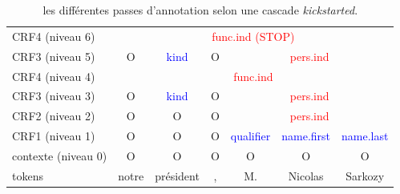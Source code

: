 \documentclass[12pt,a4paper,times,twoside,openright]{report}
\begin{document}
\begin{table}[ht!]
    \centering
    \begin{tabular}{|l|cccccc|}
    \hline
    \cline{2-7}
    CRF4 (niveau 6)     & \multicolumn{6}{c|}{\textcolor{red}{func.ind (STOP)}} \\
    \cline{2-7}
    CRF3 (niveau 5)     & O & \multicolumn{1}{|c|}{\textcolor{blue}{kind}} & O & \multicolumn{3}{|c|}{\textcolor{red}{pers.ind}} \\
    \cline{2-7}
    CRF4 (niveau 4)     & \multicolumn{6}{c|}{\textcolor{red}{func.ind}} \\
    \cline{2-7}
    CRF3 (niveau 3)     & O & \multicolumn{1}{|c|}{\textcolor{blue}{kind}} & O & \multicolumn{3}{|c|}{\textcolor{red}{pers.ind}} \\
    \cline{3-3}\cline{5-7}
    CRF2 (niveau 2)     & O & O & O & \multicolumn{3}{|c|}{\textcolor{red}{pers.ind}} \\
    \cline{5-7}
    CRF1 (niveau 1)     & O & O & O & \multicolumn{1}{|c|}{\textcolor{blue}{qualifier}} & \multicolumn{1}{c|}{\textcolor{blue}{name.first}} & \multicolumn{1}{c|}{\textcolor{blue}{name.last}} \\
    \cline{5-7}
    contexte (niveau 0) & O & O & O & O & O & O \\
    \hline
    tokens                & notre & président & , & M. & Nicolas & Sarkozy \\
    \hline
    \end{tabular}
    \caption{les différentes passes d'annotation selon une cascade \textit{kickstarted}.}
    \label{tab:kickstart-annotations}
\end{table}


    
\end{document}
